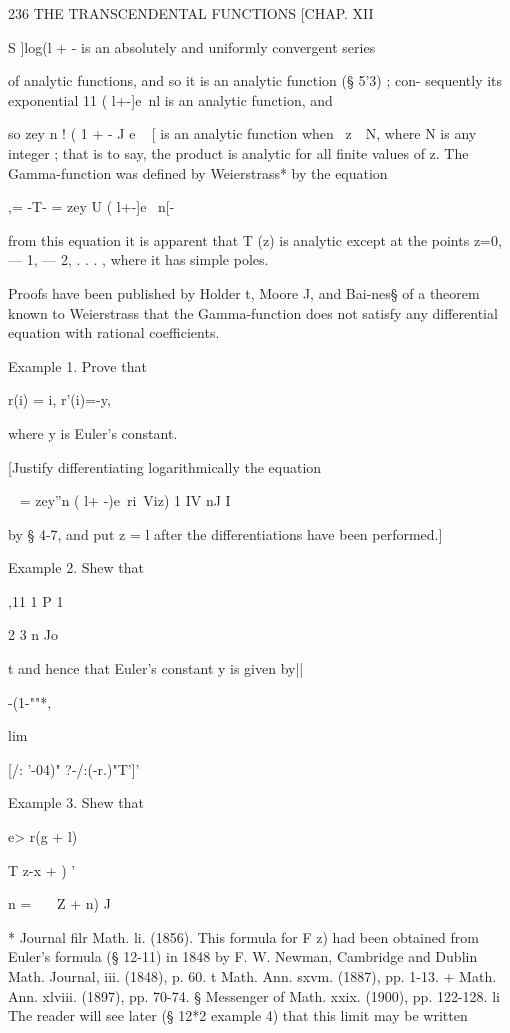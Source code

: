 236 THE TRANSCENDENTAL FUNCTIONS [CHAP. XII

S ]log(l + - is an absolutely and uniformly convergent series

of analytic functions, and so it is an analytic function (§ 5'3) ;
con- sequently its exponential 11 ( l+-]e~nl is an analytic function,
and

so zey n ! ( 1 + - J e ~ [ is an analytic function when \ z\ \ N,
where N is any integer ; that is to say, the product is analytic for
all finite values of z. The Gamma-function was defined by Weierstrass*
by the equation

,= -T- = zey U ( l+-]e ~n[-

from this equation it is apparent that T (z) is analytic except at the
points z=0, — 1, — 2, . . . , where it has simple poles.

Proofs have been published by Holder t, Moore J, and Bai-nes§ of a
theorem known to Weierstrass that the Gamma-function does not satisfy
any differential equation with rational coefficients.

Example 1. Prove that

r(i) = i, r'(i)=-y,

where y is Euler's constant.

[Justify differentiating logarithmically the equation

~ = zey''n ( l+ -)e~ri\ Viz) 1 IV nJ I

by § 4-7, and put z = l after the differentiations have been
performed.]

Example 2. Shew that

,11 1 P 1

2 3 n Jo

t and hence that Euler's constant y is given by||

-(1-""*,

lim

[/: '-04)" ?-/:(-r.)"T']'

Example 3. Shew that

e> r(g + l)

T z-x + ) '

n = \ \ \ Z + n) J

* Journal filr Math. li. (1856). This formula for F z) had been
obtained from Euler's formula (§ 12-11) in 1848 by F. W. Newman,
Cambridge and Dublin Math. Journal, iii. (1848), p. 60. t Math. Ann.
sxvm. (1887), pp. 1-13. + Math. Ann. xlviii. (1897), pp. 70-74. §
Messenger of Math. xxix. (1900), pp. 122-128. li The reader will see
later (§ 12*2 example 4) that this limit may be written

